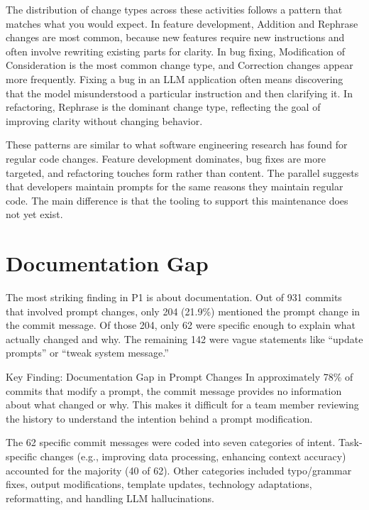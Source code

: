 \documentclass[
    pdftex,
    final,
    11pt,
    a4paper,
    parskip=false,
    oneside,
    footheight=0mm,
    footinclude=false,
    toc=bibliography
]{scrbook}
\begin{document}
The distribution of change types across these activities follows a pattern that matches what you would expect. In feature development, Addition and Rephrase changes are most common, because new features require new instructions and often involve rewriting existing parts for clarity. In bug fixing, Modification of Consideration is the most common change type, and Correction changes appear more frequently. Fixing a bug in an LLM application often means discovering that the model misunderstood a particular instruction and then clarifying it. In refactoring, Rephrase is the dominant change type, reflecting the goal of improving clarity without changing behavior.

These patterns are similar to what software engineering research has found for regular code changes. Feature development dominates, bug fixes are more targeted, and refactoring touches form rather than content. The parallel suggests that developers maintain prompts for the same reasons they maintain regular code. The main difference is that the tooling to support this maintenance does not yet exist.

\section{Documentation Gap}

The most striking finding in P1 is about documentation. Out of 931 commits that involved prompt changes, only 204 (21.9\%) mentioned the prompt change in the commit message. Of those 204, only 62 were specific enough to explain what actually changed and why. The remaining 142 were vague statements like ``update prompts'' or ``tweak system message.''

\begin{graybox}{Key Finding: Documentation Gap in Prompt Changes}
In approximately 78\% of commits that modify a prompt, the commit message provides no information about what changed or why. This makes it difficult for a team member reviewing the history to understand the intention behind a prompt modification.
\end{graybox}

The 62 specific commit messages were coded into seven categories of intent. Task-specific changes (e.g., improving data processing, enhancing context accuracy) accounted for the majority (40 of 62). Other categories included typo/grammar fixes, output modifications, template updates, technology adaptations, reformatting, and handling LLM hallucinations.
\end{document}
